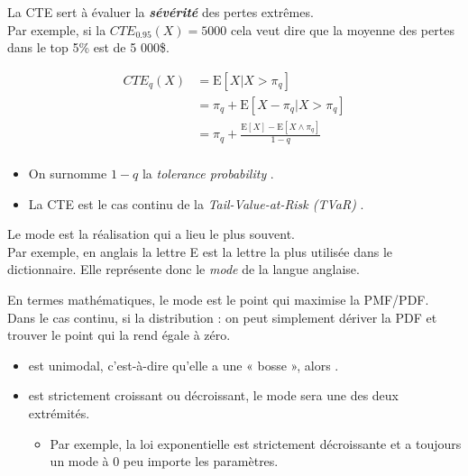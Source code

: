 \documentclass[10pt, french]{article}
\begin{document}
\begin{multicols*}{2}
\begin{definitionNOHFILL}
\begin{rappel_enhanced}[Contexte]
La CTE sert à évaluer la \textit{\textbf{sévérité}} des pertes extrêmes. \\

Par exemple, si la $CTE_{0.95}(X)	=	5000$ cela veut dire que la moyenne des pertes dans le top 5\% est de 5 000\$.
\end{rappel_enhanced}

\begin{align*}
	CTE_{q}(X)
	&=	\text{E}[X | X > \pi_{q}]	\\
	&=	\pi_{q} + \text{E}[X - \pi_{q} | X > \pi_{q}]		\\
	&=	\pi_{q} + \frac{\text{E}[X]	- \text{E}[X \wedge \pi_{q}]	}{1 - q}	\\
\end{align*}

\begin{itemize}
	\item	On surnomme $1	-	q$ la \og \textit{tolerance probability} \fg{}.
	\item	La CTE est le cas continu de la \og \textit{Tail-Value-at-Risk (TVaR)} \fg{}.
\end{itemize}
\end{definitionNOHFILL}


\begin{definitionNOHFILL}[Mode]
\begin{rappel_enhanced}[Contexte]
Le mode est la réalisation qui a lieu le plus souvent. \\
Par exemple, en anglais la lettre E est la lettre la plus utilisée dans le dictionnaire. Elle représente donc le \textit{mode} de la langue anglaise.
\end{rappel_enhanced}

En termes mathématiques, le mode est le point qui maximise la PMF/PDF.\\

Dans le cas continu, si la distribution : 
on peut simplement dériver la PDF et trouver le point qui la rend égale à zéro.
\begin{itemize}
	\item	est unimodal, c'est-à-dire qu'elle a une « bosse », alors .
	\item	est strictement croissant ou décroissant, le mode sera une des deux extrémités.
		\begin{itemize}
		\item	Par exemple, la loi exponentielle est strictement décroissante et a toujours un mode à $0$ peu importe les paramètres.
		\end{itemize}
\end{itemize}
\end{definitionNOHFILL}


\end{multicols*}
\end{document}
